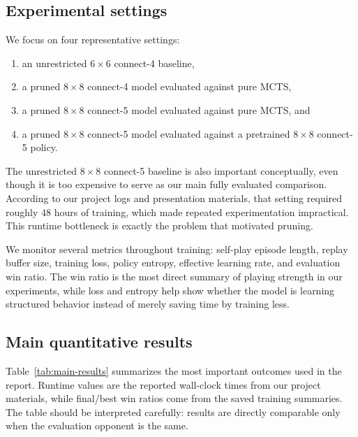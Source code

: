 \documentclass{article}
\begin{document}
\subsection{Experimental settings}

We focus on four representative settings:
\begin{enumerate}
  \item an unrestricted \(6 \times 6\) connect-4 baseline,
  \item a pruned \(8 \times 8\) connect-4 model evaluated against pure MCTS,
  \item a pruned \(8 \times 8\) connect-5 model evaluated against pure MCTS, and
  \item a pruned \(8 \times 8\) connect-5 model evaluated against a pretrained \(8 \times 8\) connect-5 policy.
\end{enumerate}

The unrestricted \(8 \times 8\) connect-5 baseline is also important conceptually, even though it is too expensive to serve as our main fully evaluated comparison. According to our project logs and presentation materials, that setting required roughly 48 hours of training, which made repeated experimentation impractical. This runtime bottleneck is exactly the problem that motivated pruning.

We monitor several metrics throughout training: self-play episode length, replay buffer size, training loss, policy entropy, effective learning rate, and evaluation win ratio. The win ratio is the most direct summary of playing strength in our experiments, while loss and entropy help show whether the model is learning structured behavior instead of merely saving time by training less.

\subsection{Main quantitative results}

Table~\ref{tab:main-results} summarizes the most important outcomes used in the report. Runtime values are the reported wall-clock times from our project materials, while final/best win ratios come from the saved training summaries. The table should be interpreted carefully: results are directly comparable only when the evaluation opponent is the same.
\end{document}
